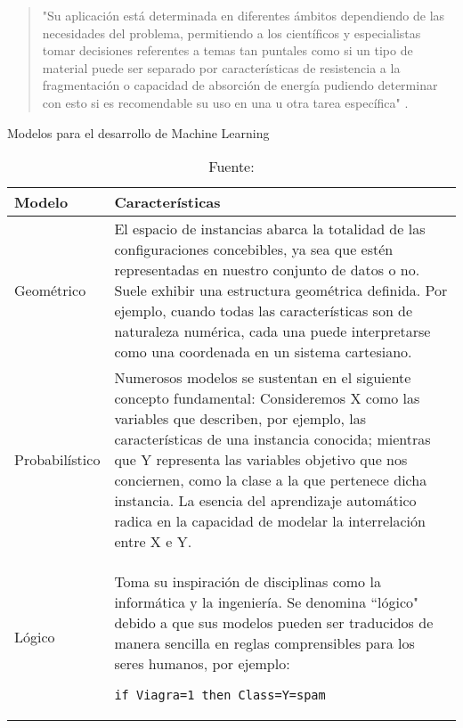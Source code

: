 \begin{quote}
    "Su aplicación está determinada en diferentes ámbitos dependiendo de las necesidades del problema, permitiendo a los científicos y especialistas tomar decisiones referentes a temas tan puntales como si un tipo de material puede ser separado por características de resistencia a la fragmentación o capacidad de absorción de energía pudiendo determinar con esto si es recomendable su uso en una u otra tarea específica" \citep[p.42]{salamanca2021}.
\end{quote}

\begin{table}[htbp]
\centering
\caption{Modelos para el desarrollo de Machine Learning}
\label{tab:modelos}
\begin{tabular}{|l|p{10cm}|}
\hline
\textbf{Modelo} & \textbf{Características} \\
\hline
Geométrico & El espacio de instancias abarca la totalidad de las configuraciones concebibles, ya sea que estén representadas en nuestro conjunto de datos o no. Suele exhibir una estructura geométrica definida. Por ejemplo, cuando todas las características son de naturaleza numérica, cada una puede interpretarse como una coordenada en un sistema cartesiano. \\
\hline
Probabilístico & Numerosos modelos se sustentan en el siguiente concepto fundamental: Consideremos X como las variables que describen, por ejemplo, las características de una instancia conocida; mientras que Y representa las variables objetivo que nos conciernen, como la clase a la que pertenece dicha instancia. La esencia del aprendizaje automático radica en la capacidad de modelar la interrelación entre X e Y. \\
\hline
Lógico & Toma su inspiración de disciplinas como la informática y la ingeniería. Se denomina ``lógico" debido a que sus modelos pueden ser traducidos de manera sencilla en reglas comprensibles para los seres humanos, por ejemplo: \begin{verbatim}
if Viagra=1 then Class=Y=spam
\end{verbatim} \\
\hline
\end{tabular}
\caption*{\footnotesize Fuente: \citet[p.~43]{salamanca2021}}
\end{table}

